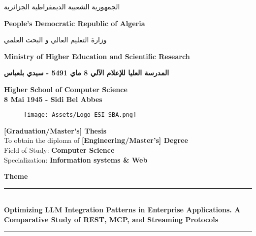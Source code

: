 \begin{titlepage}

\centering
\begin{Arabic}
    {\normalsize \textsc{الجمهورية الشعبية الديمقراطية الجزائرية}} \\[1mm]
\end{Arabic}
{\normalsize \textbf{People's Democratic Republic of Algeria}} \\[1mm]

\begin{Arabic}
    {\normalsize \textsc{وزارة التعليم العالي و البحث العلمي}} \\[1mm]
\end{Arabic}
{\normalsize \textbf{Ministry of Higher Education and Scientific Research}}\\

\begin{Arabic}
    {\normalsize \textbf{المدرسة العليا للإعلام الآلي \hspace{0.3mm} 8 ماي 5491 - سيدي بلعباس}}\\[1mm]
\end{Arabic}
{\normalsize \textbf{Higher School of Computer Science \\[1mm] 8 Mai 1945 - Sidi Bel Abbes}}\\

\vspace{0.5cm}


\begin{figure}[ht]
    \centering
    \texttt{[image: Assets/Logo\_ESI\_SBA.png]}
\end{figure}

\vspace{0.3cm}

\Large \textbf{[Graduation/Master's] Thesis} \\
\vspace{0.4cm}
{\normalsize To obtain the diploma of \textbf{[Engineering/Master's] Degree}} \\
{\normalsize Field of Study: \textbf{Computer Science}} \\
{\normalsize Specialization: \textbf{Information systems \& Web}} \\
\vspace{0.4cm}

\Large \textbf{Theme}\\
\rule{15cm}{0.2mm}\\
\vspace{0.4cm}
\centering
{\textbf{Optimizing LLM Integration Patterns in Enterprise Applications. A Comparative Study of REST, MCP, and Streaming Protocols}}\\
\rule{15cm}{0.2mm}\\
\vspace{0.2cm}


\end{titlepage}
